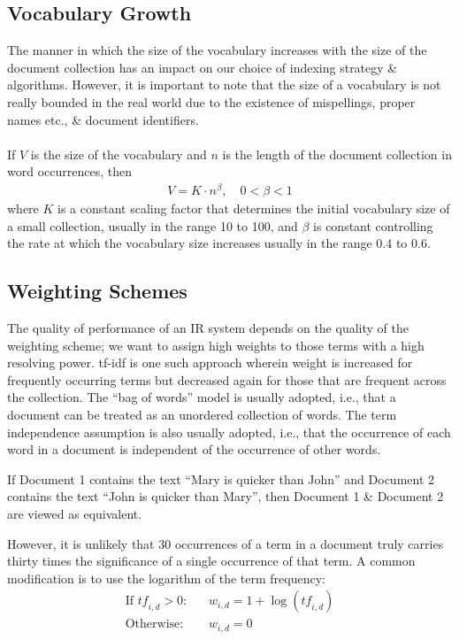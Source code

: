 \documentclass[a4paper,11pt]{article}
\begin{document}
\subsection{Vocabulary Growth}
The manner in which the size of the vocabulary increases with the size of the document collection has an impact on our choice of indexing strategy \& algorithms.
However, it is important to note that the size of a vocabulary is not really bounded in the real world due to the existence of mispellings, proper names etc., \& document identifiers.
\\\\
If $V$ is the size of the vocabulary and $n$ is the length of the document collection in word occurrences, then
\begin{align*}
    V = K \cdot n^\beta, \quad 0 < \beta < 1
\end{align*}
where $K$ is a constant scaling factor that determines the initial vocabulary size of a small collection, usually in the range 10 to 100, and $\beta$ is constant controlling the rate at which the vocabulary size increases usually in the range 0.4 to 0.6.

\subsection{Weighting Schemes}
The quality of performance of an IR system depends on the quality of the weighting scheme; we want to assign high weights to those terms with a high resolving power.
tf-idf is one such approach wherein weight is increased for frequently occurring terms but decreased again for those that are frequent across the collection.
The ``bag of words'' model is usually adopted, i.e., that a document can be treated as an unordered collection of words.
The term independence assumption is also usually adopted, i.e., that the occurrence of each word in a document is independent of the occurrence of other words.

\begin{tcolorbox}[colback=gray!10, colframe=black, title=\textbf{``Bag of Words'' / Term Independence Example}]
    If Document 1 contains the text ``Mary is quicker than John'' and Document 2 contains the text ``John is quicker than Mary'', then Document 1 \& Document 2 are viewed as equivalent.
\end{tcolorbox}

However, it is unlikely that 30 occurrences of a term in a document truly carries thirty times the significance of a single occurrence of that term.
A common modification is to use the logarithm of the term frequency:
\begin{align*}
    \text{If } \textit{tf}_{i,d} > 0 \text{:}&   \quad w_{i,d} = 1 + \log(\textit{tf}_{i,d})\\
    \text{Otherwise:}&          \quad w_{i,d} = 0
\end{align*}
\end{document}
